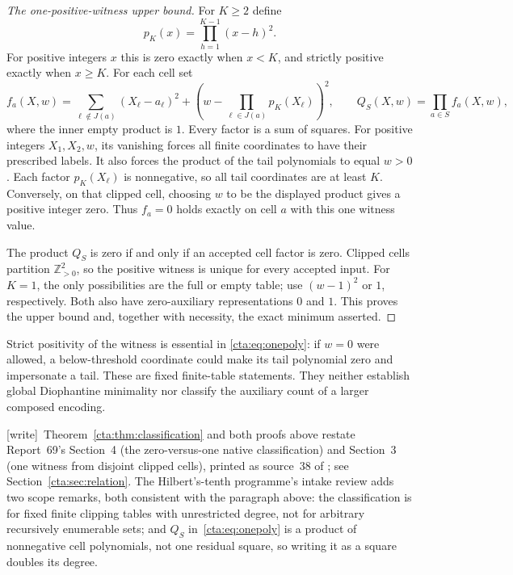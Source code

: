 \documentclass[11pt]{article}
\theoremstyle{definition}
\theoremstyle{remark}
\newcommand{\Npos}{\mathbb Z_{>0}}
\newcommand{\wtag}{\textup{[write]}}
\begin{document}
\begin{proof}[The one-positive-witness upper bound]
For $K\geq2$ define
\begin{equation}\label{cta:eq:tailpoly}
 p_K(x)=\prod_{h=1}^{K-1}(x-h)^2.
\end{equation}
For positive integers $x$ this is zero exactly when $x<K$, and strictly
positive exactly when $x\geq K$. For each cell set
\begin{equation}\label{cta:eq:onepoly}
 f_a(X,w)=\sum_{\ell\notin J(a)}(X_\ell-a_\ell)^2
       +\left(w-\prod_{\ell\in J(a)}p_K(X_\ell)\right)^2,
 \qquad Q_S(X,w)=\prod_{a\in S}f_a(X,w),
\end{equation}
where the inner empty product is $1$. Every factor is a sum of squares.
For positive integers $X_1,X_2,w$, its vanishing forces all finite
coordinates to have their prescribed labels. It also forces the product
of the tail polynomials to equal $w>0$. Each factor $p_K(X_\ell)$ is
nonnegative, so all tail coordinates are at least $K$. Conversely, on
that clipped cell, choosing $w$ to be the displayed product gives a
positive integer zero. Thus $f_a=0$ holds exactly on cell $a$ with this
one witness value.

The product $Q_S$ is zero if and only if an accepted cell factor is zero.
Clipped cells partition $\Npos^2$, so the positive witness is unique for
every accepted input. For $K=1$, the only possibilities are the full
or empty table; use $(w-1)^2$ or $1$, respectively. Both also have
zero-auxiliary representations $0$ and $1$. This proves the upper bound
and, together with necessity, the exact minimum asserted.
\end{proof}

Strict positivity of the witness is essential in \eqref{cta:eq:onepoly}:
if $w=0$ were allowed, a below-threshold coordinate could make its tail
polynomial zero and impersonate a tail. These are fixed finite-table
statements. They neither establish global Diophantine minimality nor
classify the auxiliary count of a larger composed encoding.

\wtag\ Theorem~\ref{cta:thm:classification} and both proofs above restate
Report~69's Section~4 (the zero-versus-one native classification) and
Section~3 (one witness from disjoint clipped cells), printed as source~38
of \cite{smc}; see Section~\ref{cta:sec:relation}. The Hilbert's-tenth
programme's intake review \cite{htpreview} adds two scope remarks, both
consistent with the paragraph above: the classification is for fixed
finite clipping tables with unrestricted degree, not for arbitrary
recursively enumerable sets; and $Q_S$ in~\eqref{cta:eq:onepoly} is a
product of nonnegative cell polynomials, not one residual square, so
writing it as a square doubles its degree.
\end{document}
